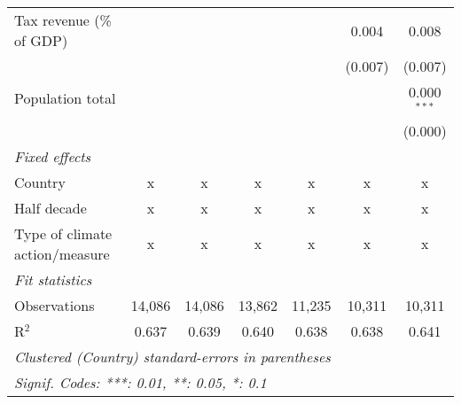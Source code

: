 \begin{tabular}{lcccccc}
   Tax revenue (\% of GDP)              &         &               &               &               & 0.004         & 0.008\\   
                                        &         &               &               &               & (0.007)       & (0.007)\\   
   Population total                     &         &               &               &               &               & 0.000$^{***}$\\   
                                        &         &               &               &               &               & (0.000)\\   
   \emph{Fixed effects}\\
   Country                              & x       & x             & x             & x             & x             & x\\  
   Half decade                          & x       & x             & x             & x             & x             & x\\  
   Type of climate action/measure       & x       & x             & x             & x             & x             & x\\  
   \midrule \emph{Fit statistics}\\
   Observations                         & 14,086  & 14,086        & 13,862        & 11,235        & 10,311        & 10,311\\  
   R$^2$                                & 0.637   & 0.639         & 0.640         & 0.638         & 0.638         & 0.641\\  
   \midrule
   \multicolumn{7}{l}{\emph{Clustered (Country) standard-errors in parentheses}}\\
   \multicolumn{7}{l}{\emph{Signif. Codes: ***: 0.01, **: 0.05, *: 0.1}}\\
\end{tabular}
\par\endgroup



